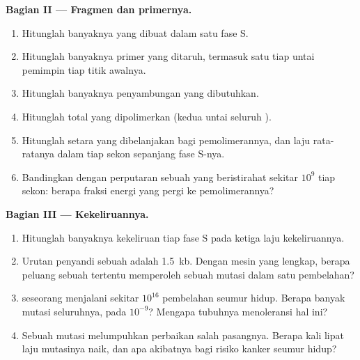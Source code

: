 \begin{problem}
\medskip
\noindent\textbf{Bagian II --- Fragmen dan primernya.}
\begin{enumerate}[resume]
  \item Hitunglah banyaknya  yang dibuat dalam satu fase S.
  \item Hitunglah banyaknya primer  yang ditaruh, termasuk satu tiap
        untai pemimpin tiap titik awalnya.
  \item Hitunglah banyaknya penyambungan yang dibutuhkan.
  \item Hitunglah total  yang dipolimerkan (kedua untai
        seluruh ).
  \item Hitunglah setara  yang dibelanjakan bagi pemolimerannya, dan
        laju rata-ratanya dalam  tiap sekon sepanjang fase S-nya.
  \item Bandingkan dengan perputaran  sebuah  yang beristirahat
        sekitar $10^9$ tiap sekon: berapa fraksi energi  yang
        pergi ke pemolimerannya?
\end{enumerate}

\medskip
\noindent\textbf{Bagian III --- Kekeliruannya.}
\begin{enumerate}[resume]
  \item Hitunglah banyaknya kekeliruan tiap fase S pada ketiga laju
        kekeliruannya.
  \item Urutan penyandi sebuah  adalah \qty{1.5}{kb}. Dengan mesin
        yang lengkap, berapa peluang sebuah  tertentu memperoleh
        sebuah mutasi dalam satu pembelahan?
  \item {} seseorang menjalani sekitar $10^{16}$ pembelahan seumur
        hidup. Berapa banyak mutasi seluruhnya, pada $10^{-9}$? Mengapa
        tubuhnya menoleransi hal ini?
  \item Sebuah mutasi melumpuhkan perbaikan salah pasangnya. Berapa
        kali lipat laju mutasinya naik, dan apa akibatnya bagi risiko
        kanker seumur hidup?
\end{enumerate}


\end{problem}
